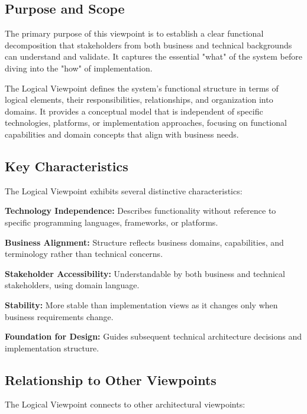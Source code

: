 \documentclass[11pt,letterpaper]{article}
\begin{document}
\subsection{Purpose and Scope}

The primary purpose of this viewpoint is to establish a clear functional decomposition that stakeholders from both business and technical backgrounds can understand and validate. It captures the essential "what" of the system before diving into the "how" of implementation.

\begin{definitionbox}
The Logical Viewpoint defines the system's functional structure in terms of logical elements, their responsibilities, relationships, and organization into domains. It provides a conceptual model that is independent of specific technologies, platforms, or implementation approaches, focusing on functional capabilities and domain concepts that align with business needs.
\end{definitionbox}

\subsection{Key Characteristics}

The Logical Viewpoint exhibits several distinctive characteristics:

\textbf{Technology Independence:} Describes functionality without reference to specific programming languages, frameworks, or platforms.

\textbf{Business Alignment:} Structure reflects business domains, capabilities, and terminology rather than technical concerns.

\textbf{Stakeholder Accessibility:} Understandable by both business and technical stakeholders, using domain language.

\textbf{Stability:} More stable than implementation views as it changes only when business requirements change.

\textbf{Foundation for Design:} Guides subsequent technical architecture decisions and implementation structure.

\subsection{Relationship to Other Viewpoints}

The Logical Viewpoint connects to other architectural viewpoints:
\end{document}
